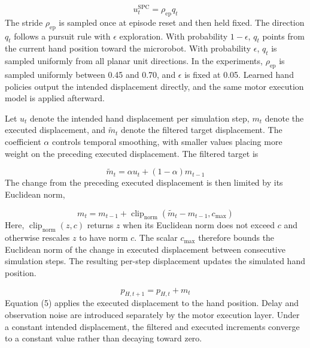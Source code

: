 \documentclass[journal,twoside,web]{ieeecolor2}
\begin{document}
\begin{equation}
u_t^{\mathrm{SPC}} = \rho_{\mathrm{ep}} q_t
\end{equation}
The stride $\rho_{\mathrm{ep}}$ is sampled once at episode reset and then held fixed. The direction $q_t$ follows a pursuit rule with $\epsilon$ exploration. With probability $1-\epsilon$, $q_t$ points from the current hand position toward the microrobot. With probability $\epsilon$, $q_t$ is sampled uniformly from all planar unit directions. In the experiments, $\rho_{\mathrm{ep}}$ is sampled uniformly between 0.45 and 0.70, and $\epsilon$ is fixed at 0.05. Learned hand policies output the intended displacement directly, and the same motor execution model is applied afterward.

Let $u_t$ denote the intended hand displacement per simulation step, $m_t$ denote the executed displacement, and $\widetilde{m}_t$ denote the filtered target displacement. The coefficient $\alpha$ controls temporal smoothing, with smaller values placing more weight on the preceding executed displacement. The filtered target is

\begin{equation}
\widetilde{m}_t = \alpha u_t + (1-\alpha)m_{t-1}
\end{equation}
The change from the preceding executed displacement is then limited by its Euclidean norm,

\begin{equation}
m_t = m_{t-1} + \operatorname{clip}_{\mathrm{norm}}(\widetilde{m}_t-m_{t-1},c_{\max})
\end{equation}
Here, $\operatorname{clip}_{\mathrm{norm}}(z,c)$ returns $z$ when its Euclidean norm does not exceed $c$ and otherwise rescales $z$ to have norm $c$. The scalar $c_{\max}$ therefore bounds the Euclidean norm of the change in executed displacement between consecutive simulation steps. The resulting per-step displacement updates the simulated hand position.

\begin{equation}
p_{H,t+1} = p_{H,t} + m_t
\end{equation}
Equation (5) applies the executed displacement to the hand position. Delay and observation noise are introduced separately by the motor execution layer. Under a constant intended displacement, the filtered and executed increments converge to a constant value rather than decaying toward zero.
\end{document}
